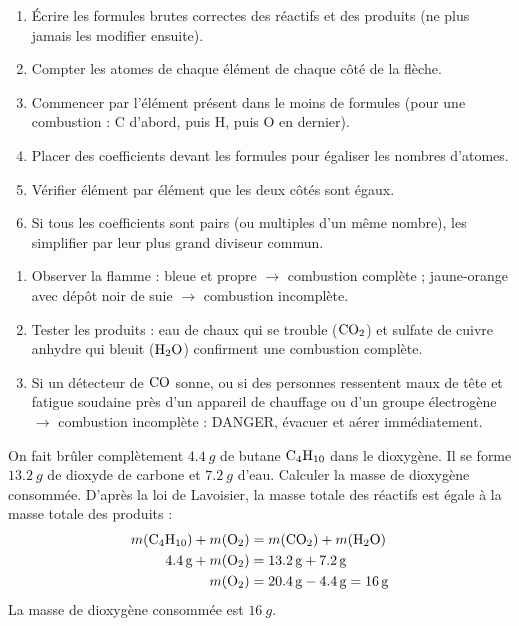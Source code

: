 \documentclass[11pt]{article}
\newcounter{popsec}
\newcounter{popsub}
\newcommand{\courssub}[1]{%
  \stepcounter{popsub}%
  \par\vspace{9pt}\noindent{\popxbold\fontsize{11.5}{13}\selectfont\color{popink}{\color{poporange}\thepopsec.\thepopsub}\hspace{6pt}#1}\par\nopagebreak\vspace{4pt}
}
\begin{document}
\begin{bilan}
\courssub{Méthodes express}
\begin{methode}
    \begin{enumerate}
        \item Écrire les formules brutes correctes des réactifs et des produits (ne plus jamais les modifier ensuite).
        \item Compter les atomes de chaque élément de chaque côté de la flèche.
        \item Commencer par l'élément présent dans le moins de formules (pour une combustion : C d'abord, puis H, puis O en dernier).
        \item Placer des coefficients devant les formules pour égaliser les nombres d'atomes.
        \item Vérifier élément par élément que les deux côtés sont égaux.
        \item Si tous les coefficients sont pairs (ou multiples d'un même nombre), les simplifier par leur plus grand diviseur commun.
    \end{enumerate}
\end{methode}

\begin{methode}
    \begin{enumerate}
        \item Observer la flamme : bleue et propre $\rightarrow$ combustion complète ; jaune-orange avec dépôt noir de suie $\rightarrow$ combustion incomplète.
        \item Tester les produits : eau de chaux qui se trouble ($\ce{CO2}$) et sulfate de cuivre anhydre qui bleuit ($\ce{H2O}$) confirment une combustion complète.
        \item Si un détecteur de $\ce{CO}$ sonne, ou si des personnes ressentent maux de tête et fatigue soudaine près d'un appareil de chauffage ou d'un groupe électrogène $\rightarrow$ combustion incomplète : DANGER, évacuer et aérer immédiatement.
    \end{enumerate}
\end{methode}

\end{bilan}

\begin{exoresolu}
On fait brûler complètement $\SI{4,4}{g}$ de butane $\ce{C4H10}$ dans le dioxygène. Il se forme $\SI{13,2}{g}$ de dioxyde de carbone et $\SI{7,2}{g}$ d'eau. Calculer la masse de dioxygène consommée.
\tcblower
D'après la loi de Lavoisier, la masse totale des réactifs est égale à la masse totale des produits :
\begin{align*}
m(\ce{C4H10}) + m(\ce{O2}) &= m(\ce{CO2}) + m(\ce{H2O})\\
\SI{4,4}{g} + m(\ce{O2}) &= \SI{13,2}{g} + \SI{7,2}{g}\\
m(\ce{O2}) &= \SI{20,4}{g} - \SI{4,4}{g} = \SI{16}{g}
\end{align*}
La masse de dioxygène consommée est $\SI{16}{g}$.
\end{exoresolu}
\end{document}
